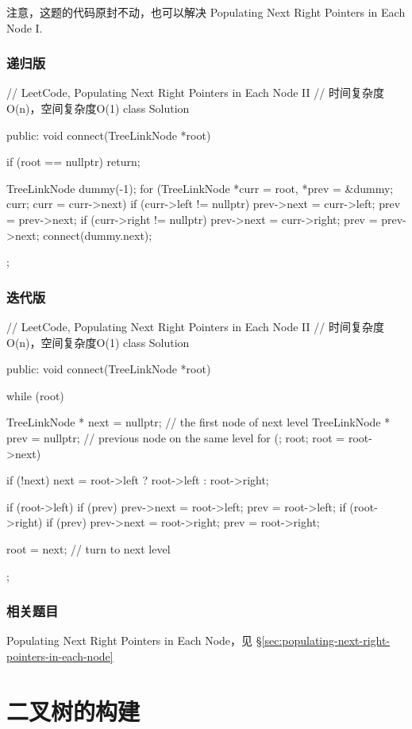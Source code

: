 注意，这题的代码原封不动，也可以解决 Populating Next Right Pointers in Each Node I.


\subsubsection{递归版}
\begin{Code}
	// LeetCode, Populating Next Right Pointers in Each Node II
	// 时间复杂度O(n)，空间复杂度O(1)
	class Solution {
		public:
		void connect(TreeLinkNode *root) {
			if (root == nullptr) return;
			
			TreeLinkNode dummy(-1);
			for (TreeLinkNode *curr = root, *prev = &dummy; 
			curr; curr = curr->next) {
				if (curr->left != nullptr){
					prev->next = curr->left;
					prev = prev->next;
				}
				if (curr->right != nullptr){
					prev->next = curr->right;
					prev = prev->next;
				}
			}
			connect(dummy.next);
		}
	};
\end{Code}


\subsubsection{迭代版}
\begin{Code}
	// LeetCode, Populating Next Right Pointers in Each Node II
	// 时间复杂度O(n)，空间复杂度O(1)
	class Solution {
		public:
		void connect(TreeLinkNode *root) {
			while (root) {
				TreeLinkNode * next = nullptr; // the first node of next level
				TreeLinkNode * prev = nullptr; // previous node on the same level
				for (; root; root = root->next) {
					if (!next) next = root->left ? root->left : root->right;
					
					if (root->left) {
						if (prev) prev->next = root->left;
						prev = root->left;
					}
					if (root->right) {
						if (prev) prev->next = root->right;
						prev = root->right;
					}
				}
				root = next; // turn to next level
			}
		}
	};
\end{Code}


\subsubsection{相关题目}
\begindot
\item Populating Next Right Pointers in Each Node，见 \S \ref{sec:populating-next-right-pointers-in-each-node}
\myenddot


\section{二叉树的构建} %


